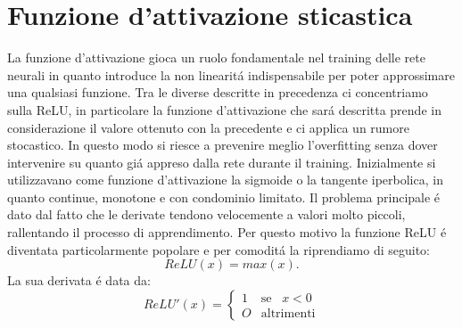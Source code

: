 \documentclass[a4paper,12pt]{report}
\begin{document}
 \section{Funzione d'attivazione sticastica}
 La funzione d'attivazione gioca un ruolo fondamentale nel training delle rete neurali in quanto introduce la non linearit\'a indispensabile per poter approssimare una qualsiasi funzione. Tra le diverse descritte in precedenza ci concentriamo sulla ReLU, in particolare la funzione d'attivazione che sar\'a descritta prende in considerazione il valore ottenuto con la precedente e ci applica un rumore stocastico. In questo modo si riesce a prevenire meglio l'overfitting senza dover intervenire su quanto gi\'a appreso dalla rete durante il training. 
 Inizialmente si utilizzavano come funzione d'attivazione la sigmoide o la tangente iperbolica, in quanto continue, monotone e con condominio limitato. Il problema principale \'e dato dal fatto che le derivate tendono velocemente a valori molto piccoli, rallentando il processo di apprendimento. Per questo motivo la funzione ReLU \'e diventata particolarmente popolare e per comodit\'a la riprendiamo di seguito:
 \begin{equation} 
  ReLU\left(x\right) = max\left(x\right). 
 \end{equation} 
 La sua derivata  \'e data da:
 \begin{equation} 
  ReLU'\left(x\right) = \begin{cases} 
     1 & \mbox{se} \;\;\; x < 0 \\
     O & \mbox{altrimenti} 
 \end{cases} 
 \end{equation} 
\end{document}
